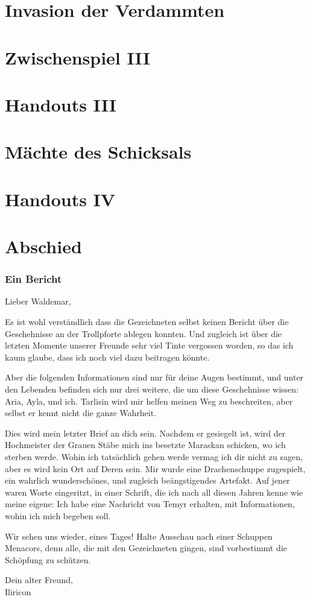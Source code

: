 \documentclass[10pt,twoside,twocolumn,openany,hidelinks]{book}
\begin{document}
\part{Invasion der Verdammten}


\part*{Zwischenspiel III}

\part*{Handouts III}

\part{Mächte des Schicksals}


\part*{Handouts IV}

\part{Abschied}

\section{Ein Bericht}

Lieber Waldemar,

Es ist wohl verständlich dass die Gezeichneten selbst keinen Bericht über die Geschehnisse an der Trollpforte ablegen konnten.
Und zugleich ist über die letzten Momente unserer Freunde sehr viel Tinte vergossen worden, so das ich kaum glaube, dass ich noch viel dazu beitragen könnte.

Aber die folgenden Informationen sind nur für deine Augen bestimmt, und unter den Lebenden befinden sich nur drei weitere, die um diese Geschehnisse wissen: Aria, Ayla, und ich. Tarlisin wird mir helfen meinen Weg zu beschreiten, aber selbst er kennt nicht die ganze Wahrheit.

Dies wird mein letzter Brief an dich sein. Nachdem er gesiegelt ist, wird der Hochmeister der Grauen Stäbe mich ins besetzte Maraskan schicken, wo ich sterben werde.
Wohin ich tatsächlich gehen werde vermag ich dir nicht zu sagen, aber es wird kein Ort auf Deren sein.
Mir wurde eine Drachenschuppe zugespielt, ein wahrlich wunderschönes, und zugleich beängstigendes Artefakt.
Auf jener waren Worte eingeritzt, in einer Schrift, die ich nach all diesen Jahren kenne wie meine eigene: Ich habe eine Nachricht von Temyr erhalten, mit Informationen, wohin ich mich begeben soll.

Wir sehen uns wieder, eines Tages! Halte Ausschau nach einer Schuppen Menacors, denn alle, die mit den Gezeichneten gingen, sind vorbestimmt die Schöpfung zu schützen.

Dein alter Freund,\\
Iliricon
\end{document}
